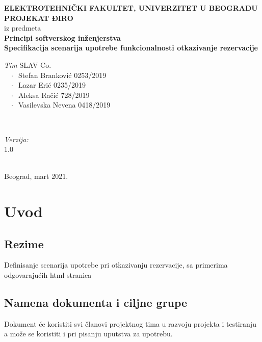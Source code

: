 \documentclass[12pt]{article}
\begin{document}
    \renewcommand{\labelenumii}{\arabic{enumi}.\arabic{enumii}}
	\begin{titlepage}  
		\center
		\textbf{ \LARGE ELEKTROTEHNIČKI FAKULTET, UNIVERZITET U BEOGRADU } \\[4cm]
		\textbf{ \Large PROJEKAT ĐIRO\texttrademark} \\[0.3cm]
		iz predmeta \\[0.3cm]
		\textbf{ \Large Principi softverskog inženjerstva} \\[0.7cm]
		{ \huge \bfseries Specifikacija scenarija upotrebe funkcionalnosti otkazivanje rezervacije } \\[5cm]
		

		\begin{minipage}{0.5\textwidth}
			\begin{flushleft}
				\large
				\emph{Tim} SLAV Co. \\
			     $\;\;\; \cdot \;\;$Stefan Branković  0253/2019\\
			     $\;\;\; \cdot \;\;$Lazar Erić 0235/2019\\
			     $\;\;\; \cdot \;\;$Aleksa Račić 728/2019\\
			     $\;\;\; \cdot \;\;$Vasilevska Nevena 0418/2019
			\end{flushleft}
		\end{minipage}
		~
		\begin{minipage}{0.4\textwidth}
			\begin{flushright}
				\large
				\emph{Verzija:} \\
				1.0
			\end{flushright}
		\end{minipage} \\[2cm]
		\enlargethispage{4\baselineskip}
		{ \large Beograd, mart 2021. }
		\vfill
	\end{titlepage}
\pagebreak
\tableofcontents
\pagebreak



\section{Uvod}
\subsection{Rezime}
Definisanje scenarija upotrebe pri otkazivanju rezervacije, sa primerima odgovarajućih html stranica
\subsection{Namena dokumenta i ciljne grupe}
Dokument će koristiti svi članovi projektnog tima u razvoju projekta i testiranju a može se koristiti i pri pisanju uputstva za
upotrebu.
\end{document}
